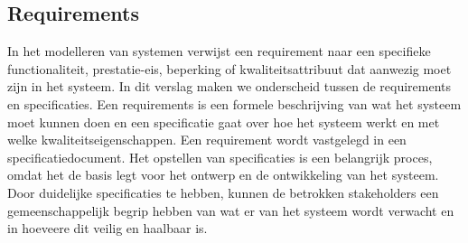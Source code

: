 \documentclass{article}
\begin{document}
	

	
	
	
	
	
	\subsection{Requirements}
	In het modelleren van systemen verwijst een requirement naar een specifieke functionaliteit, prestatie-eis, beperking of kwaliteitsattribuut dat aanwezig moet zijn in het systeem. %
	In dit verslag maken we onderscheid tussen de requirements en specificaties. Een requirements is een formele beschrijving van wat het systeem moet kunnen doen en een specificatie gaat over hoe het systeem werkt en met welke kwaliteitseigenschappen. Een requirement wordt vastgelegd in een specificatiedocument.
	Het opstellen van specificaties%
	 is een belangrijk proces, omdat het de basis legt voor het ontwerp en de ontwikkeling van het systeem. Door duidelijke specificaties te hebben, kunnen de betrokken stakeholders een gemeenschappelijk begrip hebben van wat er van het systeem wordt verwacht en in hoeveere dit veilig en haalbaar is.
 
	
	
%	
%	
	
\end{document}
